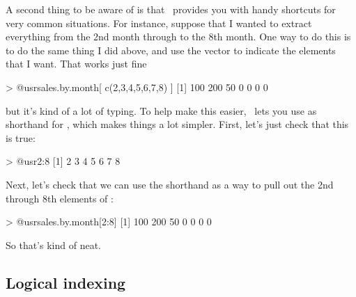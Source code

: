 A second thing to be aware of is that \R\ provides you with handy shortcuts for very common situations. For instance, suppose that I wanted to extract everything from the 2nd month through to the 8th month. One way to do this is to do the same thing I did above, and use the vector  to indicate the elements that I want. That works just fine
\begin{rblock1}
> @usr{sales.by.month[ c(2,3,4,5,6,7,8) ]}
[1] 100 200  50   0   0   0   0
\end{rblock1}
but it's kind of a lot of typing. To help make this easier, \R\ lets you use  as shorthand for , which makes things a lot simpler. First, let's just check that this is true:
\begin{rblock1}
> @usr{2:8}
[1] 2 3 4 5 6 7 8
\end{rblock1}
Next, let's check that we can use the  shorthand as a way to pull out the 2nd through 8th elements of :
\begin{rblock1}
> @usr{sales.by.month[2:8]}
[1] 100 200  50   0   0   0   0
\end{rblock1}
So that's kind of neat.

\subsection{Logical indexing}

